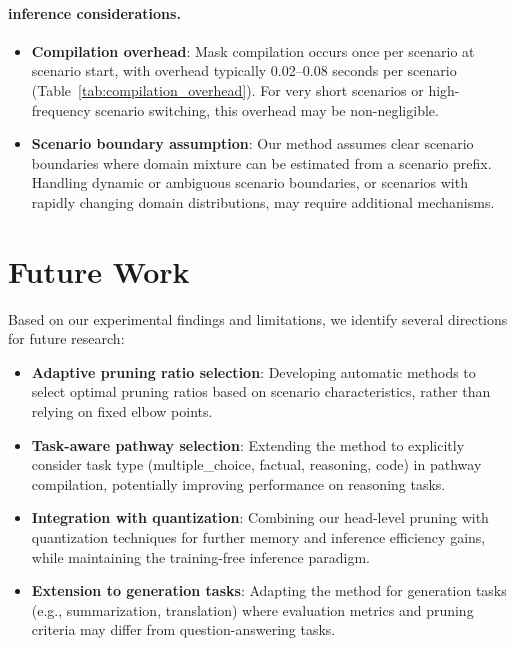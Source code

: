 \paragraph{inference considerations.}
\begin{itemize}
    \item \textbf{Compilation overhead}: Mask compilation occurs once per scenario at scenario start, with overhead typically 0.02--0.08 seconds per scenario (Table~\ref{tab:compilation_overhead}).
    For very short scenarios or high-frequency scenario switching, this overhead may be non-negligible.
    \item \textbf{Scenario boundary assumption}: Our method assumes clear scenario boundaries where domain mixture can be estimated from a scenario prefix.
    Handling dynamic or ambiguous scenario boundaries, or scenarios with rapidly changing domain distributions, may require additional mechanisms.
\end{itemize}


\section{Future Work}
\label{app:future_work}

Based on our experimental findings and limitations, we identify several directions for future research:

\begin{itemize}
    \item \textbf{Adaptive pruning ratio selection}: Developing automatic methods to select optimal pruning ratios based on scenario characteristics, rather than relying on fixed elbow points.
    \item \textbf{Task-aware pathway selection}: Extending the method to explicitly consider task type (multiple\_choice, factual, reasoning, code) in pathway compilation, potentially improving performance on reasoning tasks.
    \item \textbf{Integration with quantization}: Combining our head-level pruning with quantization techniques for further memory and inference efficiency gains, while maintaining the training-free inference paradigm.
    \item \textbf{Extension to generation tasks}: Adapting the method for generation tasks (e.g., summarization, translation) where evaluation metrics and pruning criteria may differ from question-answering tasks.
\end{itemize}

